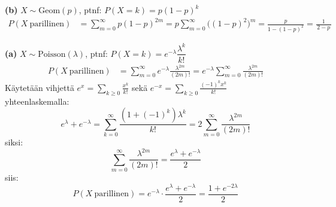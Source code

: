 \documentclass[12pt,a4paper]{article}
\begin{document}
\begin{kohta}
\item[\textbf{(b)}] \textbf{$X\sim\mathrm{Geom}(p)$}, ptnf: $P(X=k)=p(1-p)^k$
\[
\begin{aligned}
P(X\ \text{parillinen})
&=\sum_{m=0}^\infty p(1-p)^{2m}
= p\sum_{m=0}^\infty \big((1-p)^2\big)^{m}
= \frac{p}{1-(1-p)^2}
= \frac{1}{\,2-p\,}
\end{aligned}
\]

\item[\textbf{(a)}] \textbf{$X\sim\mathrm{Poisson}(\lambda)$}, ptnf: $P(X=k)=e^{-\lambda}\dfrac{\lambda^k}{k!}$
\[
\begin{aligned}
P(X\ \text{parillinen})
&=\sum_{m=0}^\infty e^{-\lambda}\frac{\lambda^{2m}}{(2m)!}
= e^{-\lambda}\sum_{m=0}^\infty\frac{\lambda^{2m}}{(2m)!}
\end{aligned}
\]
Käytetään vihjettä $e^x=\sum_{k\ge0}\frac{x^k}{k!}$ sekä $e^{-x}=\sum_{k\ge0}\frac{(-1)^k x^k}{k!}$\\
yhteenlaskemalla:
\[
e^{\lambda}+e^{-\lambda}
=\sum_{k=0}^\infty \frac{(1+(-1)^k)\lambda^k}{k!}
=2\sum_{m=0}^\infty \frac{\lambda^{2m}}{(2m)!}
\]
siksi:
\[
\sum_{m=0}^\infty \frac{\lambda^{2m}}{(2m)!}
=\frac{e^{\lambda}+e^{-\lambda}}{2}
\]
siis:
\[
P(X\ \text{parillinen})
= e^{-\lambda}\cdot\frac{e^{\lambda}+e^{-\lambda}}{2}
= \frac{1+e^{-2\lambda}}{2}
\]
\end{kohta}
\end{document}
